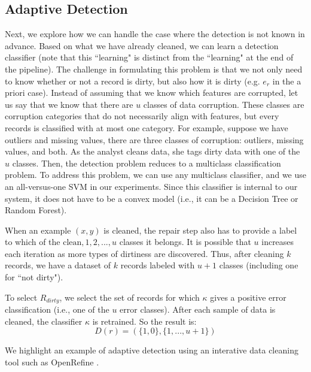 \subsection{Adaptive Detection}
Next, we explore how we can handle the case where the detection is not known in advance.
Based on what we have already cleaned, we can learn a detection classifier (note that this ``learning" is distinct from the ``learning" at the end of the pipeline).
The challenge in formulating this problem is that we not only need to know whether or not a record is dirty, but also how it is dirty (e.g. $e_r$ in the a priori case).
Instead of assuming that we know which features are corrupted, let us say that we know that there are $u$ classes of data corruption.
These classes are corruption categories that do not necessarily align with features, but every records is classified with at most one category.
For example, suppose we have outliers and missing values, there are three classes of corruption: outliers, missing values, and both.
As the analyst cleans data, she tags dirty data with one of the $u$ classes.
Then, the detection problem reduces to a multiclass classification problem.
To address this problem, we can use any multiclass classifier, and we use an all-versus-one SVM in our experiments.
Since this classifier is internal to our system, it does not have to be a convex model (i.e., it can be a Decision Tree or Random Forest).

When an example $(x,y)$ is cleaned, the repair step also has to provide a label to which of the ${\text{clean}, 1,2,...,u}$ classes it belongs. It is possible that $u$ increases each iteration as more types of dirtiness are discovered. 
Thus, after cleaning $k$ records, we have a dataset of $k$ records labeled with $u+1$ classes (including one for ``not dirty").

\begin{definition}
To select $R_{dirty}$, we select the set of records for which $\kappa$ gives a positive error classification (i.e., one of the $u$ error classes).
After each sample of data is cleaned, the classifier $\kappa$ is retrained.
So the result is:
\[D(r) = (\{1,0\},\{1,...,u+1\})\]
\end{definition}

We highlight an example of adaptive detection using an interative data cleaning tool such as OpenRefine \cite{openrefine}.

\vspace{0.25em}

